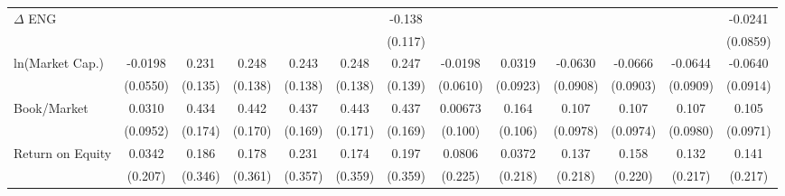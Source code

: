 {\begin{tabular}{l*{12}{c}}
$\Delta$ ENG        &                     &                     &                     &                     &                     &      -0.138         &                     &                     &                     &                     &                     &     -0.0241         \\
                    &                     &                     &                     &                     &                     &     (0.117)         &                     &                     &                     &                     &                     &    (0.0859)         \\
ln(Market Cap.)     &     -0.0198         &       0.231\sym{*}  &       0.248\sym{*}  &       0.243\sym{*}  &       0.248\sym{*}  &       0.247\sym{*}  &     -0.0198         &      0.0319         &     -0.0630         &     -0.0666         &     -0.0644         &     -0.0640         \\
                    &    (0.0550)         &     (0.135)         &     (0.138)         &     (0.138)         &     (0.138)         &     (0.139)         &    (0.0610)         &    (0.0923)         &    (0.0908)         &    (0.0903)         &    (0.0909)         &    (0.0914)         \\
Book/Market         &      0.0310         &       0.434\sym{**} &       0.442\sym{**} &       0.437\sym{**} &       0.443\sym{**} &       0.437\sym{**} &     0.00673         &       0.164         &       0.107         &       0.107         &       0.107         &       0.105         \\
                    &    (0.0952)         &     (0.174)         &     (0.170)         &     (0.169)         &     (0.171)         &     (0.169)         &     (0.100)         &     (0.106)         &    (0.0978)         &    (0.0974)         &    (0.0980)         &    (0.0971)         \\
Return on Equity    &      0.0342         &       0.186         &       0.178         &       0.231         &       0.174         &       0.197         &      0.0806         &      0.0372         &       0.137         &       0.158         &       0.132         &       0.141         \\
                    &     (0.207)         &     (0.346)         &     (0.361)         &     (0.357)         &     (0.359)         &     (0.359)         &     (0.225)         &     (0.218)         &     (0.218)         &     (0.220)         &     (0.217)         &     (0.217)         \\

\end{tabular}}
